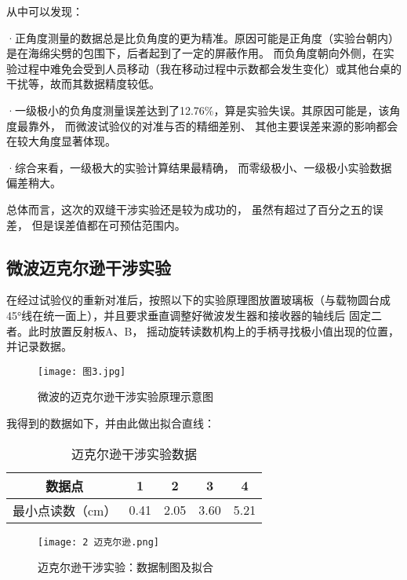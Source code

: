 \documentclass[11pt]{article}
\begin{document}
从中可以发现：

·正角度测量的数据总是比负角度的更为精准。原因可能是正角度（实验台朝内）是在海绵尖劈的包围下，后者起到了一定的屏蔽作用。
而负角度朝向外侧，在实验过程中难免会受到人员移动（我在移动过程中示数都会发生变化）或其他台桌的干扰等，故而其数据精度较低。

·一级极小的负角度测量误差达到了12.76\%，算是实验失误。其原因可能是，该角度最靠外，
而微波试验仪的对准与否的精细差别、
其他主要误差来源的影响都会在较大角度显著体现。

·综合来看，一级极大的实验计算结果最精确，
而零级极小、一级极小实验数据偏差稍大。

总体而言，这次的双缝干涉实验还是较为成功的，
虽然有超过了百分之五的误差，
但是误差值都在可预估范围内。


















\newpage



\subsection{微波迈克尔逊干涉实验}

在经过试验仪的重新对准后，按照以下的实验原理图放置玻璃板（与载物圆台成45°线在统一面上），并且要求垂直调整好微波发生器和接收器的轴线后
固定二者。此时放置反射板A、B，
摇动旋转读数机构上的手柄寻找极小值出现的位置，并记录数据。

\begin{figure}[H]
    \centering
    \texttt{[image: 图3.jpg]}
    \caption{微波的迈克尔逊干涉实验原理示意图}
\end{figure}

我得到的数据如下，并由此做出拟合直线：

\begin{table}[H]
    \centering
    \begin{tabular}{ccccc}
        \toprule
        数据点&1&2&3&4\\\midrule
        最小点读数（cm）&0.41&2.05&3.60&5.21\\
        \bottomrule
    \end{tabular}
    \caption{迈克尔逊干涉实验数据}
\end{table}

\begin{figure}[H]
    \centering
    \texttt{[image: 2 迈克尔逊.png]}
    \caption{迈克尔逊干涉实验：数据制图及拟合}
\end{figure}
\end{document}
